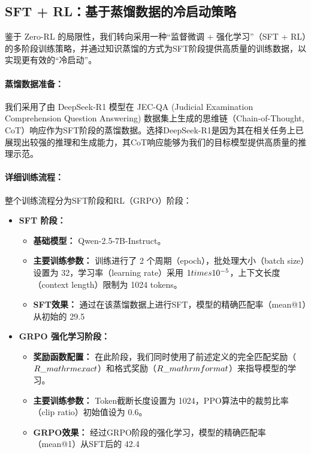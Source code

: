 \documentclass{pkuthesis}
\begin{document}
\subsection{SFT + RL：基于蒸馏数据的冷启动策略}
鉴于 Zero-RL 的局限性，我们转向采用一种“监督微调 + 强化学习”（SFT + RL）的多阶段训练策略，并通过知识蒸馏的方式为SFT阶段提供高质量的训练数据，以实现更有效的“冷启动”。

\paragraph{蒸馏数据准备：}
我们采用了由 DeepSeek-R1 模型在 JEC-QA (Judicial Examination Comprehension Question Answering) 数据集上生成的思维链（Chain-of-Thought, CoT）响应作为SFT阶段的蒸馏数据。选择DeepSeek-R1是因为其在相关任务上已展现出较强的推理和生成能力，其CoT响应能够为我们的目标模型提供高质量的推理示范。

\paragraph{详细训练流程：}
整个训练流程分为SFT阶段和RL（GRPO）阶段：
\begin{itemize}
\item \textbf{SFT 阶段：}
\begin{itemize}
\item \textbf{基础模型：} Qwen-2.5-7B-Instruct。
\item \textbf{主要训练参数：} 训练进行了 2 个周期（epoch），批处理大小（batch size）设置为 32，学习率（learning rate）采用 $1 \\times 10^{-5}$，上下文长度（context length）限制为 1024 tokens。
\item \textbf{SFT效果：} 通过在该蒸馏数据上进行SFT，模型的精确匹配率（mean@1）从初始的 29.5%
\end{itemize}
\item \textbf{GRPO 强化学习阶段：}
\begin{itemize}
\item \textbf{奖励函数配置：} 在此阶段，我们同时使用了前述定义的完全匹配奖励（$R\_{\\mathrm{exact}}$）和格式奖励（$R\_{\\mathrm{format}}$）来指导模型的学习。
\item \textbf{主要训练参数：} Token截断长度设置为 1024，PPO算法中的裁剪比率（clip ratio）初始值设为 0.6。
\item \textbf{GRPO效果：} 经过GRPO阶段的强化学习，模型的精确匹配率（mean@1）从SFT后的 42.4%
\end{itemize}
\end{itemize}
\end{document}
